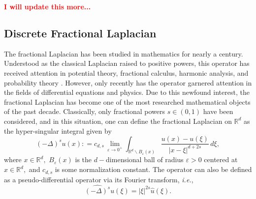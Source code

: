 \documentclass[final,1p,times]{elsarticle}
\def\RR{\mathbb R} %
\newcommand{\bb}[1]{\begin{equation}\label{#1}}
\newcommand{\ee}{\end{equation}}
\newcommand{\no}{\noindent}
\theoremstyle{remark}
\theoremstyle{definition}
\newcommand{\josh}[1]{\textcolor{red}{\textbf{#1}}}
\begin{document}
\vspace{3mm}

\no\josh{I will update this more...}

\subsection{Discrete Fractional Laplacian}

The fractional Laplacian has been studied in mathematics for nearly a century. Understood as the classical Laplacian raised to positive powers, this operator has received attention in potential theory, fractional calculus, harmonic analysis, and probability theory \cite{10.2307/1993412,bogdan1999potential,
baleanu2012fractional,valdinoci2009long}. 
However, only recently has the operator garnered attention in the fields of differential equations and physics.
Due to this newfound interest, the fractional Laplacian has become one of the most researched mathematical objects of the past decade. Classically, only fractional powers $s\in (0,1)$ have been considered, and in this situation, one can define the fractional Laplacian on $\RR^d$ as the hyper-singular integral given by
\bb{def1}
(-\Delta)^s u(x)\mathrel{\mathop:}= c_{d,s}\,\lim_{\varepsilon\to 0^+}\int_{\RR^d\backslash B_\varepsilon(x)}\frac{u(x)-u(\xi)}{|x-\xi|^{d+2s}}\,d\xi,
\ee
where $x\in\RR^d,$ $B_\varepsilon(x)$ is the $d-$dimensional ball of radius $\varepsilon>0$ centered at $x\in\RR^d,$ and $c_{d,s}$ is some normalization constant. The operator can also be defined as a pseudo-differential operator via its Fourier transform, {\em i.e.},
\bb{def2}
\widehat{(-\Delta)^s}u(\xi) = |\xi|^{2s}\hat{u}(\xi).
\ee
\end{document}
